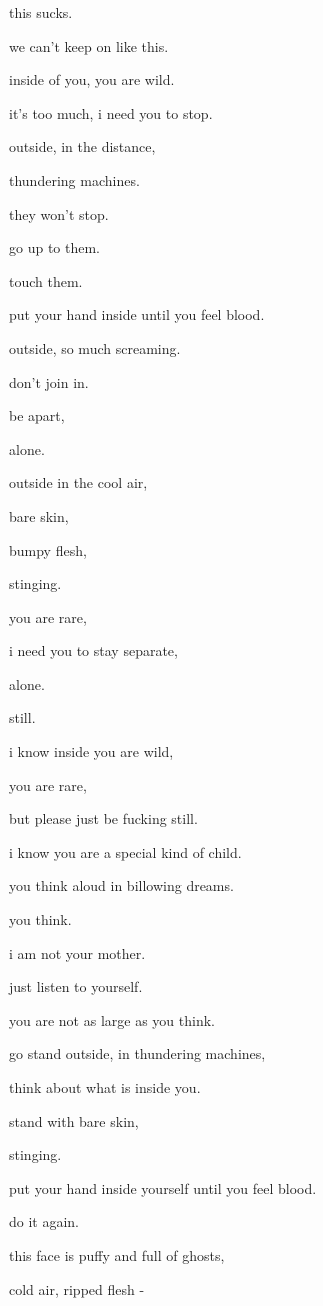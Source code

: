 \documentclass{article}
\begin{document}
	this sucks.\newpage

	we can't keep on like this.

	inside of you, you are wild.

	it's too much, i need you to stop.\newpage

	outside, in the distance,

	thundering machines.

	they won't stop.\newpage

	go up to them.

	touch them.

	put your hand inside until you feel blood.\newpage

	outside, so much screaming.

	don't join in.

	be apart, 

	alone.\newpage

	outside in the cool air,

	bare skin,

	bumpy flesh,

	stinging.\newpage

	you are rare,

	i need you to stay separate,

	alone.

	still.\newpage

	i know inside you are wild,

	you are rare,

	but please just be fucking still.\newpage

	i know you are a special kind of child.

	you think aloud in billowing dreams.

	you think.

	i am not your mother.\newpage

	just listen to yourself.

	you are not as large as you think.

	go stand outside, in thundering machines,

	think about what is inside you.\newpage

	stand with bare skin, 

	stinging.

	put your hand inside yourself until you feel blood.

	do it again.\newpage

	this face is puffy and full of ghosts,

	cold air, ripped flesh - \newpage
\end{document}
